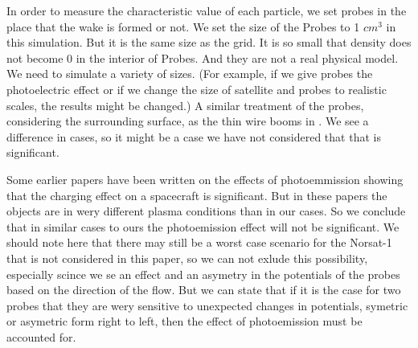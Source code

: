
In order to measure the characteristic value of each particle, we set probes in the
place that the wake is formed or not.
We set the size of the Probes to 1 $cm^3$ in this simulation. But it is the same size as the grid.
It is so small that density does not become 0 in the interior of Probes. And they are not a real
physical model. We need to simulate a variety of sizes.
(For example, if we give probes the photoelectric effect or if we change the size of satellite and
probes to realistic scales, the results might be changed.) A similar treatment of the probes, considering the surrounding surface,
as the thin wire booms in \citet{miyake_plasma_2013}.
We see a difference in cases, so it might be a case we have not considered that that is significant.

Some earlier papers have been written on the effects of photoemmission showing that the charging effect
on a spacecraft is significant.\citep{ergun_spacecraft_2010} But in these papers the objects are in wery different
plasma conditions than in our cases. So we conclude that in similar cases to ours the photoemission effect
will not be significant. We should note here that there may still be a worst case scenario for the Norsat-1
that is not considered in this paper, so we can not exlude this possibility, especially scince we se an effect and an
asymetry in the potentials of the probes based on the direction of the flow. But we can state that if
it is the case for two probes that they are wery sensitive to unexpected changes in potentials, symetric or asymetric form
right to left, then the effect of photoemission must be accounted for.
